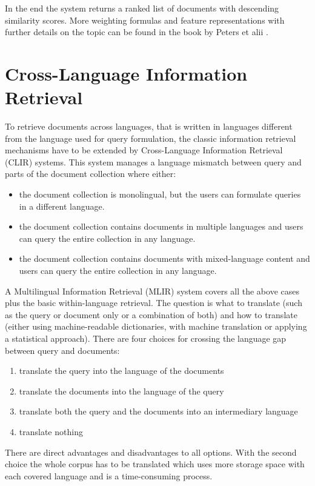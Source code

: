 \documentclass[journal]{IEEEtran}
\begin{document}
In the end the system returns a ranked list of documents with descending similarity scores.
More weighting formulas and feature representations with further details on the topic can be found in the book by Peters et alii \cite{peters12}.



\section{Cross-Language Information Retrieval}
\label{sec:clir}
To retrieve documents across languages, that is written in languages different from the language used for query formulation, the classic information retrieval mechanisms have to be extended by Cross-Language Information Retrieval (CLIR) systems.
This system manages a language mismatch between query and parts of the document collection where either:
\begin{itemize}
	\item the document collection is monolingual, but the users can formulate queries in a different language.
	\item the document collection contains documents in multiple languages and users can query the entire collection in any language.
	\item the document collection contains documents with mixed-language content and users can query the entire collection in any language.
\end{itemize}
A Multilingual Information Retrieval (MLIR) system covers all the above cases plus the basic within-language retrieval.
The question is what to translate (such as the query or document only or a combination of both) and how to translate (either using machine-readable dictionaries, with machine translation or applying a statistical approach).
There are four choices for crossing the language gap between query and documents:
\begin{enumerate}
	\item translate the query into the language of the documents
	\item translate the documents into the language of the query
	\item translate both the query and the documents into an intermediary language
	\item translate nothing
\end{enumerate}
There are direct advantages and disadvantages to all options.
With the second choice the whole corpus has to be translated which uses more storage space with each covered language and is a time-consuming process.
\end{document}
